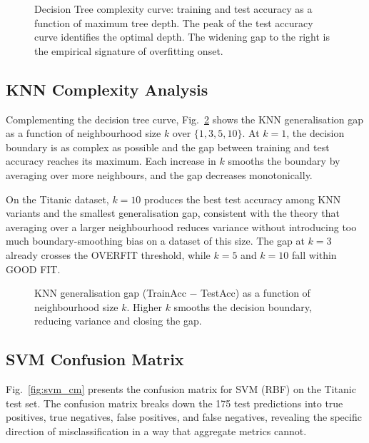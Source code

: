 \documentclass[conference]{IEEEtran}
\begin{document}
\begin{figure}[t]
    \centering
    \caption{Decision Tree complexity curve: training and test accuracy as a function of maximum tree depth. The peak of the test accuracy curve identifies the optimal depth. The widening gap to the right is the empirical signature of overfitting onset.}
    \label{fig:dt_curve}
\end{figure}

\subsection{KNN Complexity Analysis}

Complementing the decision tree curve, Fig.~\ref{fig:knn_curve} shows the KNN generalisation gap as a function of neighbourhood size $k$ over $\{1, 3, 5, 10\}$. At $k=1$, the decision boundary is as complex as possible and the gap between training and test accuracy reaches its maximum. Each increase in $k$ smooths the boundary by averaging over more neighbours, and the gap decreases monotonically.

On the Titanic dataset, $k=10$ produces the best test accuracy among KNN variants and the smallest generalisation gap, consistent with the theory that averaging over a larger neighbourhood reduces variance without introducing too much boundary-smoothing bias on a dataset of this size. The gap at $k=3$ already crosses the OVERFIT threshold, while $k=5$ and $k=10$ fall within GOOD FIT.

\begin{figure}[t]
    \centering
    \caption{KNN generalisation gap (TrainAcc $-$ TestAcc) as a function of neighbourhood size $k$. Higher $k$ smooths the decision boundary, reducing variance and closing the gap.}
    \label{fig:knn_curve}
\end{figure}

\subsection{SVM Confusion Matrix}

Fig.~\ref{fig:svm_cm} presents the confusion matrix for SVM (RBF) on the Titanic test set. The confusion matrix breaks down the 175 test predictions into true positives, true negatives, false positives, and false negatives, revealing the specific direction of misclassification in a way that aggregate metrics cannot.
\end{document}
